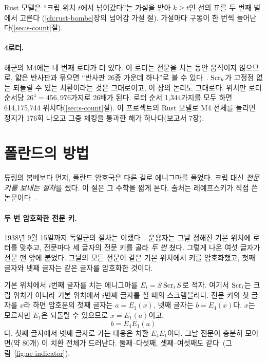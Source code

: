\Ours Rust 모델은 ``크립 위치 $t$에서 넘어갔다''는 가설을 받아 $k \geq t$인 선의 표를 두 번째 벌에서 고른다
(\ref{ch:rust-bombe}장의 넘어감 가설 절). 가설마다 구동이 한 번씩 늘어난다(\ref{sec:s-count}절).

\paragraph{4로터.} 해군의 M4에는 네 번째 로터가 더 있다. 이 로터는 전문을 치는 동안 움직이지 않으므로, 얇은 반사판과
묶으면 ``반사판 26종 가운데 하나''로 볼 수 있다~\cite{cryptomuseum-bombe}. $\mathrm{Scr}_k$가 고정점 없는 되돌릴 수 있는 치환이라는
것은 그대로이고, 이 장의 논리도 그대로다. 위치만 로터 순서당 $26^4 = 456{,}976$가지로 26배가 된다. 로터 순서 1,344가지를
모두 하면 614,175,744 위치다(\ref{sec:s-count}절). 이 프로젝트의 Rust 모델로 M4 전체를 돌리면 정지가 176회 나오고 그중
체킹을 통과한 해가 하나다(보고서 7장).

\section{폴란드의 방법}\label{sec:ac-polish}

튜링의 봄베보다 먼저, 폴란드 암호국은 다른 길로 에니그마를 풀었다. 크립 대신 \emph{전문 키를 보내는 절차}를 썼다.
이 절은 그 수학을 짧게 본다. 출처는 레예프스키가 직접 쓴 논문이다~\cite{rejewski1980application}.

\paragraph{두 번 암호화한 전문 키.} 1938년 9월 15일까지 독일군의 절차는 이랬다~\cite{rejewski1980application}. 운용자는
그날 정해진 기본 위치에 로터를 맞추고, 전문마다 세 글자의 전문 키를 골라 \emph{두 번} 쳤다. 그렇게 나온 여섯 글자가
전문 맨 앞에 붙었다. 그날의 모든 전문이 같은 기본 위치에서 키를 암호화했고, 첫째 글자와 넷째 글자는 같은 글자를
암호화한 것이다.

기본 위치에서 $i$번째 글자를 치는 에니그마를 $E_i = S\,\mathrm{Scr}_i\,S$로 적자. 여기서 $\mathrm{Scr}_i$는 크립 위치가 아니라
기본 위치에서 $i$번째 글자를 칠 때의 스크램블러다. 전문 키의 첫 글자를 $x$라 하면 암호문의
첫째 글자는 $a = E_1(x)$, 넷째 글자는 $b = E_4(x)$다. $x$는 모르지만 $E_1$은 되돌릴 수 있으므로 $x = E_1(a)$이고,
\begin{equation}
  b = E_4 E_1 (a) \label{eq:ac-indicator}
\end{equation}
다. 첫째 글자에서 넷째 글자로 가는 대응은 치환 $E_4E_1$이다. 그날 전문이 충분히 모이면(약 80개) 이 치환 전체가
드러난다. 둘째--다섯째, 셋째--여섯째도 같다~\cite{rejewski1980application}(그림~\ref{fig:ac-indicator}).

